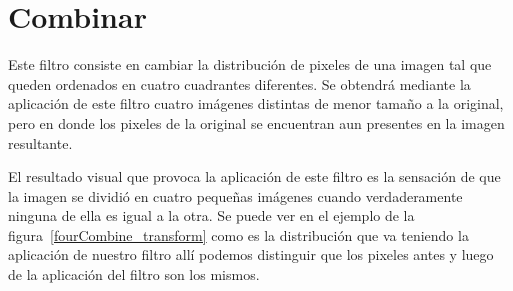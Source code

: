 \section{Combinar}
Este filtro consiste en cambiar la distribución de pixeles de una imagen tal que queden ordenados en cuatro cuadrantes diferentes. Se obtendrá mediante la aplicación de este filtro cuatro imágenes distintas de menor tamaño a la original, pero en donde los pixeles de la original se encuentran aun presentes en la imagen resultante.

El resultado visual que provoca la aplicación de este filtro es la sensación de que la imagen se dividió en cuatro pequeñas imágenes cuando verdaderamente ninguna de ella es igual a la otra. 
Se puede ver en el ejemplo de la figura~\ref{fourCombine_transform} como es la distribución que va teniendo la aplicación de nuestro filtro allí podemos distinguir que los pixeles antes y luego de la aplicación del filtro son los mismos.
